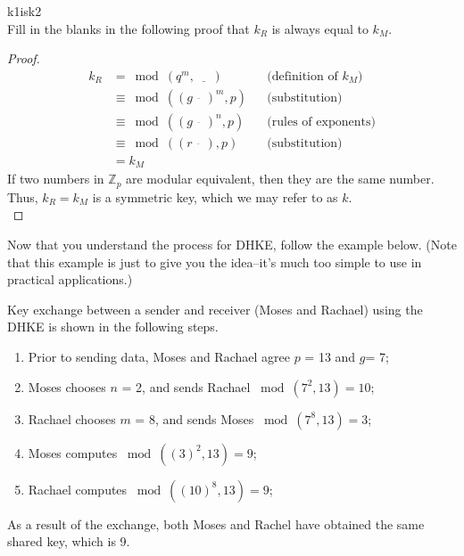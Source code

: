 \begin{exercise}{k1isk2}\\
Fill in the blanks in the following proof that  $k_R$ is always equal to  $k_M$.\\
  	\begin{proof} 
		\begin{align*} 
		k_R &=   \bmod (q^m , \underline{~~~~~~}) && \text{(definition of $k_M$)}
		\\&\equiv \bmod ((g^{\underline{~~~~~~}})^m , p) &&  \text{(substitution)}	
		\\&\equiv \bmod ((g^{\underline{~~~~~~}})^n , p) &&  \text{(rules of exponents)}
		\\&\equiv \bmod ((r^{\underline{~~~~~~}}) , p) &&  \text{(substitution)}		
		\\&= k_M
		\end{align*} 
   	If two numbers in $\mathbb{Z}_p$ are modular equivalent, then they are the same number. Thus, $k_R = k_M$ is a symmetric key, which we may refer to as $k$.\\

  	\end{proof}
\end{exercise}

Now that you understand the process for DHKE, follow the example below.  (Note that this example is just to give you the idea--it's much too simple to use in practical applications.)

 \begin{eg} Key exchange between a sender and receiver (Moses and Rachael) using the DHKE is shown in the following steps.
\begin{enumerate}[Step 1.]
\item Prior to sending data, Moses and Rachael agree $p$ = 13 and $g$= 7; 
\item Moses chooses $n$ = 2, and sends Rachael $\bmod (7^2 , 13) = 10$;
\item Rachael chooses $m$ = 8, and sends Moses $\bmod (7^8  , 13) = 3 $;
\item Moses computes $\bmod ((3)^2 , 13 ) = 9$;
\item Rachael computes $\bmod ((10)^8 , 13 ) = 9$;
\end{enumerate}
As a result of the exchange, both Moses and Rachel have obtained the same shared key, which is 9.
\end{eg}


